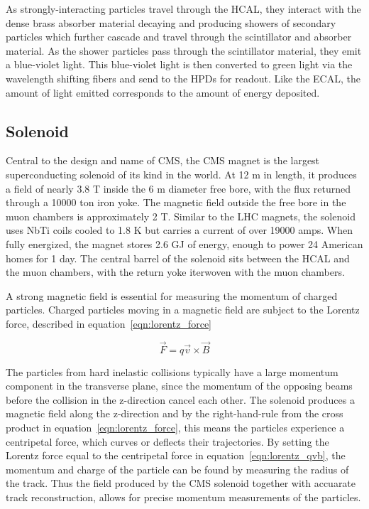 As strongly-interacting particles travel through the HCAL, they interact with the dense brass absorber material decaying and producing showers of secondary particles which further cascade and travel through the scintillator and absorber material.
As the shower particles pass through the scintillator material, they emit a blue-violet light. This blue-violet light is then converted to green light via the wavelength shifting fibers and send to the HPDs for readout. Like the ECAL,
the amount of light emitted corresponds to the amount of energy deposited. 

\subsection{Solenoid}
Central to the design and name of CMS, the CMS magnet is the largest superconducting solenoid of its kind in the world.
At 12 m in length, it produces a field of nearly 3.8 T inside the 6 m diameter free bore, with the flux returned through a 10000 ton iron yoke.
The magnetic field outside the free bore in the muon chambers is approximately 2 T.  
Similar to the LHC magnets, the solenoid uses NbTi coils cooled to 1.8 K but carries a current of over 19000 amps. When fully energized, the magnet
stores 2.6 GJ of energy, enough to power 24 American homes for 1 day\cite{magnet_energy}. The central barrel of the solenoid sits between the HCAL and the muon chambers, with the return yoke iterwoven with the muon chambers.

A strong magnetic field is essential for measuring the momentum of charged particles. Charged particles moving in a magnetic field are subject to the Lorentz force, described in
equation~\ref{eqn:lorentz_force} 

\begin{equation}
\label{eqn:lorentz_force}
 \vec{F} = q\vec{v} \times \vec{B}
\end{equation}

The particles from hard inelastic collisions typically have a large momentum component in the transverse plane, since the momentum of the opposing beams before the collision in the z-direction cancel each other.
The solenoid produces a magnetic field along the z-direction and by the right-hand-rule from the cross product in equation~\ref{eqn:lorentz_force}, this means the particles experience a centripetal force, which
curves or deflects their trajectories. By setting the Lorentz force equal to the centripetal force in equation~\ref{eqn:lorentz_qvb}, the momentum and charge of the particle can be found by measuring the radius of the track. 
Thus the field produced by the CMS solenoid together with accuarate track reconstruction, allows for precise momentum measurements of the particles.

